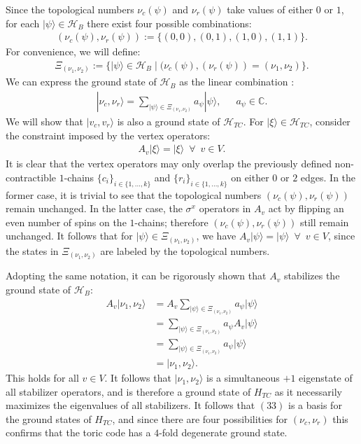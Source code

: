 \documentclass[12pt]{article}
\def\CC{\mathbb{C}}
\theoremstyle{definition}
\begin{document}
Since the topological numbers $\nu_c(\psi)$ and $\nu_r(\psi)$ take values of either $0$ or $1$, for each $|\psi\rangle\in\mathcal{H}_B$ there exist four possible combinations:
    \begin{align}
        (\nu_c(\psi),\nu_r(\psi)) := \{(0,0),(0,1),(1,0),(1,1)\}.
    \end{align}
For convenience, we will define:
    \begin{align}
        \Xi_{(\nu_1,\nu_2)} := \{|\psi\rangle\in\mathcal{H}_B\mid(\nu_c(\psi),(\nu_r(\psi)) = (\nu_1,\nu_2)\}.
    \end{align}
We can express the ground state of $\mathcal{H}_B$ as the linear combination \cite{kitaev1997}:
    \begin{align}
        |\nu_c,\nu_r\rangle = \sum_{|\psi\rangle\in\Xi_{(\nu_1,\nu_2)}}a_{\psi}|\psi\rangle,\enspace\enspace\enspace a_{\psi}\in\CC.
    \end{align}
We will show that $|v_c,v_r\rangle$ is also a ground state of $\mathcal{H}_{TC}$. For $|\xi\rangle\in\mathcal{H}_{TC}$, consider the constraint imposed by the vertex operators:
    \begin{align}
        A_v|\xi\rangle = |\xi\rangle\enspace\forall\enspace v\in V.
    \end{align}
It is clear that the vertex operators may only overlap the previously defined non-contractible $1$-chains $\{c_i\}_{i\in\{1,...,k\}}$ and $\{r_i\}_{i\in\{1,...,k\}}$ on either $0$ or $2$ edges. In the former case, it is trivial to see that the topological numbers $(\nu_c(\psi),\nu_r(\psi))$ remain unchanged. In the latter case, the $\sigma^x$ operators in $A_v$ act by flipping an even number of spins on the $1$-chains; therefore $(\nu_c(\psi),\nu_r(\psi))$ still remain unchanged. It follows that for $|\psi\rangle\in\Xi_{(\nu_1,\nu_2)}$, we have $A_v|\psi\rangle = |\psi\rangle\enspace\forall\enspace v\in V$, since the states in $\Xi_{(\nu_1,\nu_2)}$ are labeled by the topological numbers.

Adopting the same notation, it can be rigorously shown that $A_v$ stabilizes the ground state of $\mathcal{H}_B$:
    \begin{align}
        A_v|\nu_1,\nu_2\rangle &= A_v\sum_{|\psi\rangle\in\Xi_{(\nu_1,\nu_2)}}a_{\psi}|\psi\rangle\\
        &= \sum_{|\psi\rangle\in\Xi_{(\nu_1,\nu_2)}}a_{\psi}A_v|\psi\rangle\\
        &= \sum_{|\psi\rangle\in\Xi_{(\nu_1,\nu_2)}}a_{\psi}|\psi\rangle\\
        &= |\nu_1,\nu_2\rangle.
    \end{align}
This holds for all $v\in V$. It follows that $|\nu_1,\nu_2\rangle$ is a simultaneous $+1$ eigenstate of all stabilizer operators, and is therefore a ground state of $H_{TC}$ as it necessarily maximizes the eigenvalues of all stabilizers. It follows that $(33)$ is a basis for the ground states of $H_{TC}$, and since there are four possibilities for $(\nu_c,\nu_r)$ this confirms that the toric code has a $4$-fold degenerate ground state.\newpage
\end{document}
